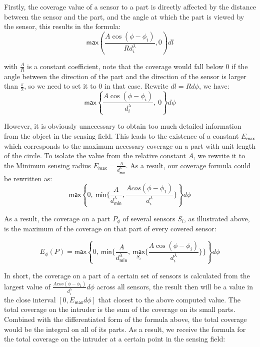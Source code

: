 Firstly, the coverage value of a sensor to a part is directly affected by the distance between the sensor and the part, and the angle at which the part is viewed by the sensor, this results in the formula:
\begin{equation}
\label{eq1}
\mathsf{max}(\frac{A\cos(\phi - \phi_i)}{Rd_i^\lambda}, 0)dl
\end{equation}


with $\frac{A}{R}$ is a constant coefficient, note that the coverage would fall below 0 if the angle between the direction of the part and the direction of the sensor is larger than $\frac{\pi}{2}$, so we need to set it to 0 in that case. Rewrite $dl = Rd\phi$, we have:
\begin{equation}
\label{eq2}
\mathsf{max}\left\{\frac{A\cos(\phi - \phi_i)}{d_i^\lambda},\ 0\right\}d\phi
\end{equation}

However, it is obviously unnecessary to obtain too much detailed information from the object in the sensing field. This leads to the existence of a constant $E_{\mathsf{max}}$ which corresponds to the maximum necessary coverage on a part with unit length of the circle. To isolate the value from the relative constant $A$, we rewrite it to the Minimum sensing radius $E_{\mathsf{max}} = \frac{A}{d_{\mathsf{min}}^\lambda}$. As a result, our coverage formula could be rewritten as:
\begin{equation}
\label{eq3}
\mathsf{max}\left\{0,\ \mathsf{min}\Big\{\frac{A}{d_{\mathsf{min}}^\lambda}, \frac{Acos(\phi - \phi_1)}{d_i^\lambda}\Big\}\right\}d\phi
\end{equation}

As a result, the coverage on a part $P_\phi$ of several sensors $S_i$, as illustrated above, is the maximum of the coverage on that part of every covered sensor:

\begin{equation}
\label{eq4}
E_\phi(P) = \mathsf{max}\left\{0,\ \mathsf{min}\Big\{\frac{A}{d_{\mathsf{min}}^\lambda},\ \underset{S_i}{\mathsf{max}}\big\{\frac{A\cos(\phi - \phi_i)}{d_i^\lambda}\big\}\Big\}\right\}d\phi
\end{equation}


In short, the coverage on a part of a certain set of sensors is calculated from the largest value of $\displaystyle\frac{Acos(\phi - \phi_1)}{d_i^\lambda}d\phi$ across all sensors, the result then will be a value in the close interval $[0, E_{\mathsf{max}}d\phi]$ that closest to the above computed value. The total coverage on the intruder is the sum of the coverage on its small parts. Combined with the differentiated form of the formula above, the total coverage would be the integral on all of its parts. As a result, we receive the formula for the total coverage on the intruder at a certain point in the sensing field:

